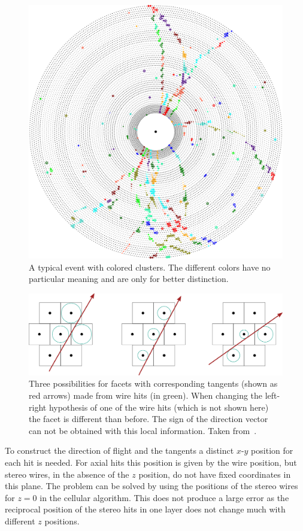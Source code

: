\begin{figure}
  \centering
  \includegraphics[width=0.8\linewidth]{figures/theory/clusters.png} 
  \caption[Clusters in the automaton track finder.]{A typical event with colored clusters. The different colors have no particular meaning and are only for better distinction.}
  \label{fig-clusters}
\end{figure}

\begin{figure}
  \centering
  \includegraphics[width=\linewidth]{figures/theory/facets.pdf}
  \caption[Facets used in the automaton track finder.]{Three possibilities for facets with corresponding tangents (shown as red arrows) made from wire hits (in green). When changing the left-right hypothesis of one of the wire hits (which is not shown here) the facet is different than before. The sign of the direction vector can not be obtained with this local information. Taken from~\cite{oliver}.}
  \label{fig-facets}
\end{figure}

To construct the direction of flight and the tangents a distinct $x$-$y$ position for each hit is needed. For axial hits this position is given by the wire position, but stereo wires, in the absence of the $z$ position, do not have fixed coordinates in this plane. The problem can be solved by using the positions of the stereo wires for $z = 0$ in the cellular algorithm. This does not produce a large error as the reciprocal position of the stereo hits in one layer does not change much with different $z$ positions.

